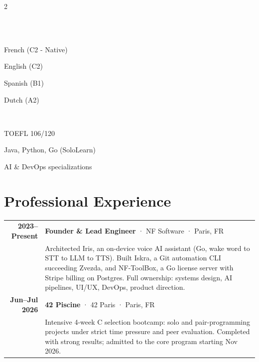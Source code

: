 \documentclass[lighthipster]{simplehipstercv}
\begin{document}
\begin{paracol}{2}
{\vspace{1em}

\\[0.5em]




\bigskip

\\[0.5em]

French (C2 - Native)

English (C2)

Spanish (B1)

Dutch (A2)

\bigskip

\\[0.5em]

{\footnotesize TOEFL 106/120

Java, Python, Go (SoloLearn)

AI \& DevOps specializations}

\vfill

}
\switchcolumn

\small
\section*{Professional Experience}

\begin{tabular}{r| p{}}
    \textbf{2023--Present} & \textbf{Founder \& Lead Engineer} · \textcolor{cvgreen}{NF Software} · Paris, FR \\
    & {\footnotesize Architected Iris, an on-device voice AI assistant (Go, wake word to STT to LLM to TTS). Built Iskra, a Git automation CLI succeeding Zvezda, and NF-ToolBox, a Go license server with Stripe billing on Postgres. Full ownership: systems design, AI pipelines, UI/UX, DevOps, product direction.} \\[0.8em]

    \textbf{Jun--Jul 2026} & \textbf{42 Piscine} · \textcolor{cvgreen}{42 Paris} · Paris, FR \\
    & {\footnotesize Intensive 4-week C selection bootcamp: solo and pair-programming projects under strict time pressure and peer evaluation. Completed with strong results; admitted to the core program starting Nov 2026.} \\[0.8em]


\end{tabular}
\end{paracol}
\end{document}
